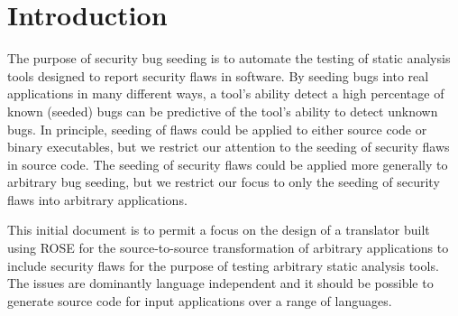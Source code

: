\section{Introduction}


   The purpose of security bug seeding is to automate the testing of static analysis
tools designed to report security flaws in software.  By seeding bugs into
real applications in many different ways, a tool's ability detect a high
percentage of known (seeded) bugs can be predictive of the tool's
ability to detect unknown bugs.  In principle, seeding of flaws could be applied 
to either source code or binary executables, but we restrict our attention to 
the seeding of security flaws in source code.  The seeding of security flaws 
could be applied more generally to arbitrary bug seeding, but we 
restrict our focus to only the seeding of security flaws into arbitrary applications.

   This initial document is to permit a focus on the design of
a translator built using ROSE for the source-to-source transformation
of arbitrary applications to include security flaws for the purpose
of testing arbitrary static analysis tools.  The issues are dominantly
language independent and it should be possible to generate source
code for input applications over a range of languages.


